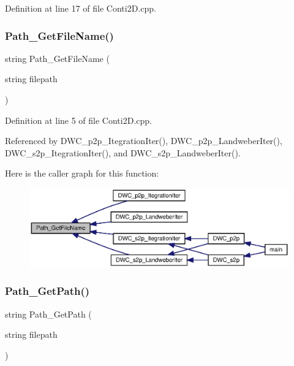 Definition at line 17 of file Conti2\+D.\+cpp.

\mbox{\label{Conti2D_8h_a88f10a86b8808047787d2df5e8cbcb72_a88f10a86b8808047787d2df5e8cbcb72}} 
\subsubsection{Path\+\_\+\+Get\+File\+Name()}
{\footnotesize\ttfamily string Path\+\_\+\+Get\+File\+Name (\begin{DoxyParamCaption}\item[{string}]{filepath }\end{DoxyParamCaption})}



Definition at line 5 of file Conti2\+D.\+cpp.



Referenced by D\+W\+C\+\_\+p2p\+\_\+\+Itegration\+Iter(), D\+W\+C\+\_\+p2p\+\_\+\+Landweber\+Iter(), D\+W\+C\+\_\+s2p\+\_\+\+Itegration\+Iter(), and D\+W\+C\+\_\+s2p\+\_\+\+Landweber\+Iter().

Here is the caller graph for this function\+:\nopagebreak
\begin{figure}[H]
\begin{center}
\leavevmode
\includegraphics[width=350pt]{Conti2D_8h_a88f10a86b8808047787d2df5e8cbcb72_a88f10a86b8808047787d2df5e8cbcb72_icgraph}
\end{center}
\end{figure}
\mbox{\label{Conti2D_8h_acb5dfc7e5499641f231021a61660b0b7_acb5dfc7e5499641f231021a61660b0b7}} 
\subsubsection{Path\+\_\+\+Get\+Path()}
{\footnotesize\ttfamily string Path\+\_\+\+Get\+Path (\begin{DoxyParamCaption}\item[{string}]{filepath }\end{DoxyParamCaption})}



